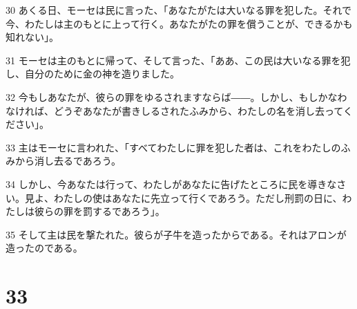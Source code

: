 \par 30 あくる日、モーセは民に言った、「あなたがたは大いなる罪を犯した。それで今、わたしは主のもとに上って行く。あなたがたの罪を償うことが、できるかも知れない」。
\par 31 モーセは主のもとに帰って、そして言った、「ああ、この民は大いなる罪を犯し、自分のために金の神を造りました。
\par 32 今もしあなたが、彼らの罪をゆるされますならば――。しかし、もしかなわなければ、どうぞあなたが書きしるされたふみから、わたしの名を消し去ってください」。
\par 33 主はモーセに言われた、「すべてわたしに罪を犯した者は、これをわたしのふみから消し去るであろう。
\par 34 しかし、今あなたは行って、わたしがあなたに告げたところに民を導きなさい。見よ、わたしの使はあなたに先立って行くであろう。ただし刑罰の日に、わたしは彼らの罪を罰するであろう」。
\par 35 そして主は民を撃たれた。彼らが子牛を造ったからである。それはアロンが造ったのである。

\chapter{33}

